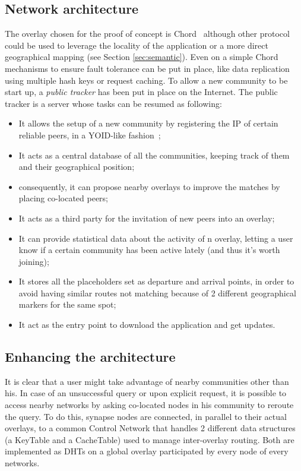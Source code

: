 \subsection{Network architecture}
%
The overlay chosen for the proof of concept is Chord~\cite{chord}
although other protocol could be used to leverage the locality of the
application or a more direct geographical mapping (see Section
\ref{sec:semantic}).  Even on a simple Chord mechanisms to ensure
fault tolerance can be put in place, like data replication using
multiple hash keys or request caching.  To allow a new community to be
start up, a \emph{public tracker} has been put in place on the
Internet. The public tracker is a server whose tasks can be resumed as
following:
%
\begin{itemize}
\item It allows the setup of a new community by registering the IP of
  certain reliable peers, in a YOID-like
  fashion~\cite{francis2000yoid};
\item It acts as a central database of all the communities, keeping
  track of them and their geographical position;
\item consequently, it can propose nearby overlays to improve the
  matches by placing co-located peers;
\item It acts as a third party for the invitation of new peers into an
  overlay;
\item It can provide statistical data about the activity of n overlay,
  letting a user know if a certain community has been active lately
  (and thus it's worth joining);
\item It stores all the placeholders set as departure and arrival
  points, in order to avoid having similar routes not matching because
  of 2 different geographical markers for the same spot;
\item It act as the entry point to download the application and get
  updates.
\end{itemize}

\subsection{Enhancing the architecture}
%
It is clear that a user might take advantage of nearby communities
other than his. In case of an unsuccessful query or upon explicit
request, it is possible to access nearby networks by asking co-located
nodes in his community to reroute the query.  To do this, synapse
nodes are connected, in parallel to their actual overlays, to a common
Control Network that handles 2 different data structures (a KeyTable
and a CacheTable) used to manage inter-overlay routing. Both are
implemented as DHTs on a global overlay participated by every node of
every networks.

